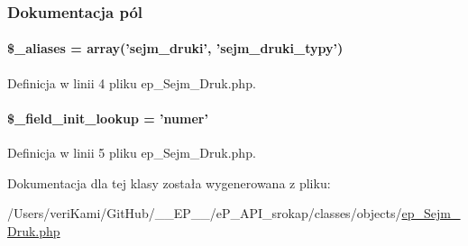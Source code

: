 \subsubsection{Dokumentacja pól}
\hypertarget{classep___sejm___druk_ab4e31d75f0bc5d512456911e5d01366b}{
\paragraph[{\$\-\_\-aliases}]{\setlength{\rightskip}{0pt plus 5cm}\$\-\_\-aliases = array('sejm\-\_\-druki', 'sejm\-\_\-druki\-\_\-typy')}}\label{classep___sejm___druk_ab4e31d75f0bc5d512456911e5d01366b}


Definicja w linii 4 pliku ep\-\_\-\-Sejm\-\_\-\-Druk.\-php.

\hypertarget{classep___sejm___druk_a4a4d54ae35428077a7c61ec8a5139af3}{
\paragraph[{\$\-\_\-field\-\_\-init\-\_\-lookup}]{\setlength{\rightskip}{0pt plus 5cm}\$\-\_\-field\-\_\-init\-\_\-lookup = 'numer'}}\label{classep___sejm___druk_a4a4d54ae35428077a7c61ec8a5139af3}


Definicja w linii 5 pliku ep\-\_\-\-Sejm\-\_\-\-Druk.\-php.



Dokumentacja dla tej klasy została wygenerowana z pliku\-:\begin{DoxyCompactItemize}
\item 
/\-Users/veri\-Kami/\-Git\-Hub/\-\_\-\-\_\-\-E\-P\-\_\-\-\_\-/e\-P\-\_\-\-A\-P\-I\-\_\-srokap/classes/objects/\hyperlink{ep___sejm___druk_8php}{ep\-\_\-\-Sejm\-\_\-\-Druk.\-php}\end{DoxyCompactItemize}
